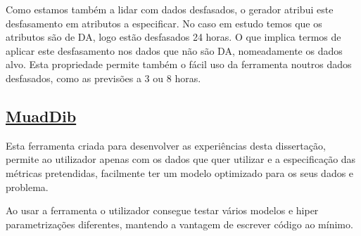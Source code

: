 Como estamos também a lidar com dados desfasados, o gerador atribui este desfasamento em atributos a especificar. No caso em estudo temos que os atributos são de \gls{DA}, logo estão desfasados 24 horas. O que implica termos de aplicar este desfasamento nos dados que não são \gls{DA}, nomeadamente os dados alvo. Esta propriedade permite também o fácil uso da ferramenta noutros dados desfasados, como as previsões a 3 ou 8 horas.\par

\subsection{\href{https://github.com/alquimodelia/MuadDib}{MuadDib}\label{se:muaddib}}

Esta ferramenta criada para desenvolver as experiências desta dissertação, permite ao utilizador apenas com os dados que quer utilizar e a especificação das métricas pretendidas, facilmente ter um modelo optimizado para os seus dados e problema.\par
Ao usar a ferramenta o utilizador consegue testar vários modelos e hiper parametrizações diferentes, mantendo a vantagem de escrever código ao mínimo.\par

